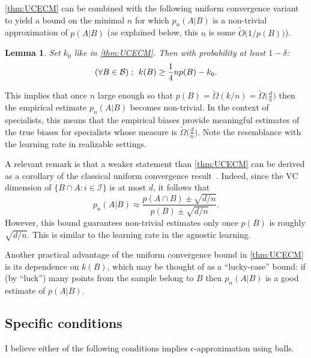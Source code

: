 \documentclass{article}
\newtheorem{lemma}[theorem]{Lemma}
\newcommand{\B}{{\cal B}}
\newcommand{\I}{\mathcal{I}}
\begin{document}
\ref{thm:UCECM} can be combined with the following uniform convergence 
variant to yield a bound on the minimal $n$ for which $p_n(A \vert B)$ 
is a non-trivial approximation of $p(A \vert B)$
(as explained below, this $n$ is some $\tilde O\bigl(1/p(B)\bigr)$).
\begin{lemma}\label{lem:uconeside}
Set $k_0$ like in \ref{thm:UCECM}. Then with probability at least $1-\delta$:
\[
(\forall B\in \B):~ k(B) \geq \frac{1}{4}np(B) - {k_0}.
\]
\end{lemma}
This implies that once $n$ large enough so that $p(B)=\tilde\Omega(k/n)=\tilde\Omega\bigl(\frac{d}{n}\bigr)$
then the empirical estimate $p_n(A\vert B)$ becomes non-trivial.
In the context of specialists, this means that the empirical
biases provide meaningful estimates of the true biases 
for specialists whose measure is $\tilde\Omega\bigl(\frac{d}{n}\bigr)$.
Note the resemblance with the learning rate in realizable settings.
%

A relevant remark is that a weaker statement than \ref{thm:UCECM}
can be derived as a corollary of the classical uniform convergence
result~\cite{vapnik}. 
Indeed, since the VC dimension of $\{B\cap A : i\in \I\}$ is at most $d$, it follows that 
\[p_n(A\vert B)\approx\frac{p(A\cap B) \pm \sqrt{d/n}}{p(B)\pm \sqrt{d/n}}.\]
However, this bound guarantees non-trivial estimates only once $p(B)$ is roughly $\sqrt{d/n}$.
This is similar to the learning rate in the agnostic learning.

Another practical advantage of the uniform convergence bound in \ref{thm:UCECM} is its dependence on $k(B)$,
which may be thought of as a ``lucky-case'' bound:
if (by ``luck'') many points from the sample belong to $B$ 
then $p_n(A\vert B)$ is a good estimate of $p(A\vert B)$.


\subsection{Specific conditions}

I believe either of the following conditions implies
$\epsilon$-approximation using balls.
\end{document}
